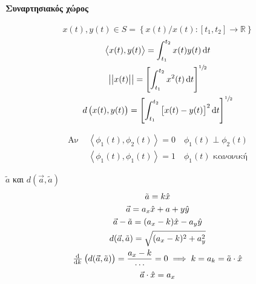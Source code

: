 \documentclass[11pt,a4paper,titlepage,fleqn]{article}
\begin{document}
    \paragraph{Συναρτησιακός χώρος}
    \[
    x(t),y(t) \in S =
    \left\lbrace x(t)/x(t):[t_1,t_2]\to\mathbb R  \right\rbrace
    \]
    \begin{gather*}
    \left\langle
    x(t),y(t)
    \right\rangle  = \int_{t_1}^{t_2}x(t)y(t)\dif t\\
    \left\vert\middle\vert x(t)\middle\vert\right\vert =
    \left[ \int_{t_1}^{t_2} x^2(t)\dif t \right]^{\sfrac{1}{2}}\\
    d\left(
    x(t),y(t)
    \right)=\left[
    \int_{t_1}^{t_2} \left[ x(t)-y(t) \right]^2\dif t
    \right]^{\sfrac{1}{2}}
    \end{gather*}
    
    
    \begin{align*}
    \text{Αν } & \left\langle \phi_1(t),\phi_2(t) \right\rangle
    = 0 \quad \phi_1(t) \perp \phi_2(t) \\
    & \left\langle \phi_1(t),\phi_1(t)\right\rangle = 1 \quad
    \phi_1(t) \text{ κανονική}
    \end{align*}
    
    
    \( \tilde{a} \) και \( d(\vec a,\tilde a) \)
    \begin{gather*}
    	\tilde a = k\hat x \\
    	\vec a = a_x\hat x+a+y\hat y\\
    	\vec a -\tilde a = (a_x-k)\hat x - a_y\hat y\\
    	d(\vec a,\tilde a) = \sqrt{(a_x-k)^2+a_y^2} \\
    	\od{}{k}\left( d(\vec a,\tilde a) \right) = \frac{a_x-k}{\cdots}
    	= 0 \implies k=a_k = \tilde a \cdot \hat x\\
    	\vec a\cdot\hat x = a_x
    \end{gather*}
    
\end{document}
